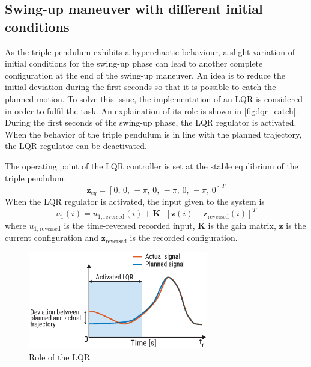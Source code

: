 \documentclass[a4paper,12pt]{article}
\begin{document}
\subsection{Swing-up maneuver with different initial conditions}
As the triple pendulum exhibits a hyperchaotic behaviour, a slight variation of initial conditions for the swing-up phase can lead to another complete configuration at the end of the swing-up maneuver. An idea is to reduce the initial deviation during the first seconds so that it is possible to catch the planned motion. To solve this issue, the implementation of an LQR is considered in order to fulfil the task. An explaination of its role is shown in \autoref{fig:lqr_catch}. During the first seconds of the swing-up phase, the LQR regulator is activated. When the behavior of the triple pendulum is in line with the planned trajectory, the LQR regulator can be deactivated. 

The operating point of the LQR controller is set at the stable equlibrium of the triple pendulum:
\[\mathbf{z}_{eq}=[0,\,0,\,-\pi,\,0,\,-\pi,\,0,\,-\pi,\,0]^T\]
When the LQR regulator is activated, the input given to the system is
\[u_1(i)=u_{1,\text{reversed}}(i) + \mathbf{K}\cdot[\mathbf{z}(i)-\mathbf{z}_{\text{reversed}}(i)]^T\]
where $u_{1,\text{reversed}}$ is the time-reversed recorded input, $\mathbf{K}$ is the gain matrix, $\mathbf{z}$ is the current configuration and $\mathbf{z}_{\text{reversed}}$ is the recorded configuration.


\begin{figure}[ht]
	\centering
	\includegraphics[width=0.7\textwidth]{illustrations/lqr_catch-03.eps}
	\caption{Role of the LQR}
	\label{fig:lqr_catch}
\end{figure}


\end{document}

